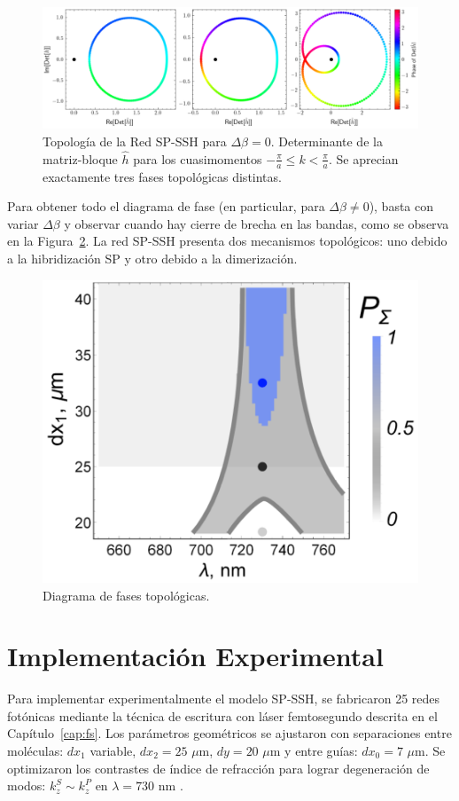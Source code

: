 \begin{figure}[H]
	\centering
	\includegraphics[width=\linewidth]{media/sp-ssh-012.png}
	\caption[Topología de la Red SP-SSH para $\Delta\beta = 0$.]{Topología de la Red SP-SSH para $\Delta\beta = 0$. Determinante de la matriz-bloque $\hat{h}$ para los cuasimomentos $-\frac{\pi}{a} \le k  < \frac{\pi}{a}$. Se aprecian exactamente tres fases topológicas distintas. \label{fig:sp-wilson}}
\end{figure}
Para obtener todo el diagrama de fase (en particular, para $\Delta \beta \neq 0$), basta con variar $\Delta \beta$ y observar cuando hay cierre de brecha en las bandas, como se observa en la Figura~\ref{fig:sp-ssh-phase-diagram}.  La red SP-SSH presenta dos mecanismos topológicos: uno debido a la hibridización SP y otro debido a la dimerización.
\begin{figure}[H]
	\centering
	\includegraphics[width=0.6\linewidth]{media/sp-ssh-phase-diagram.png}
	\caption{Diagrama de fases topológicas. \label{fig:sp-ssh-phase-diagram}}
\end{figure}
\section{Implementación Experimental}

Para implementar experimentalmente el modelo SP-SSH, se fabricaron 25 redes fotónicas mediante la técnica de escritura con láser femtosegundo descrita en el Capítulo~\ref{cap:fs}. Los parámetros geométricos se ajustaron con separaciones entre moléculas: $dx_1$ variable, $dx_2 = 25$ $\mu$m, $dy = 20$ $\mu$m y entre guías: $dx_0 = 7$ $\mu$m. Se optimizaron los contrastes de índice de refracción para lograr degeneración de modos: $k_z^S \sim k_z^P$ en $\lambda = 730$ nm \cite{interorbital}.

